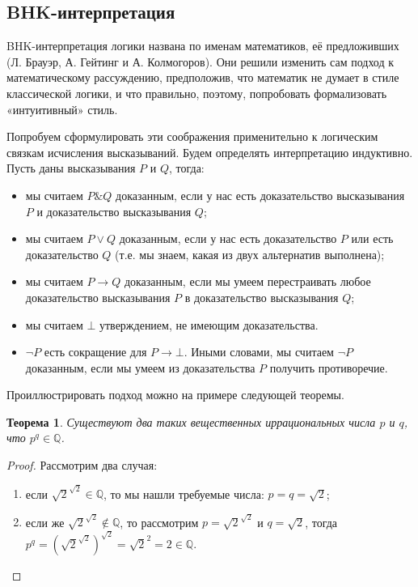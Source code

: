 \documentclass[a4paper,11pt]{article}
\newtheorem{thm}{Теорема}[section]
\theoremstyle{definition}
\begin{document}
\subsection*{BHK-интерпретация}
BHK-интерпретация логики названа по именам математиков, её предложивших (Л.
Брауэр, А. Гейтинг и А. Колмогоров). Они решили изменить сам подход к
математическому рассуждению, предположив, что математик не думает в стиле
классической логики, и что правильно, поэтому, попробовать формализовать
«интуитивный» стиль.

Попробуем сформулировать эти соображения применительно к логическим связкам
исчисления высказываний. Будем определять интерпретацию индуктивно. Пусть даны
высказывания $P$ и $Q$, тогда:
\begin{itemize}
\item мы считаем $P\mathbin{\&}Q$ доказанным, если у нас есть доказательство
  высказывания $P$ и доказательство высказывания $Q$;
\item мы считаем $P\vee Q$ доказанным, если у нас есть доказательство $P$ или
  есть доказательство $Q$ (т.е. мы знаем, какая из двух альтернатив выполнена);
\item мы считаем $P \to Q$ доказанным, если мы умеем перестраивать любое
  доказательство высказывания $P$ в доказательство высказывания $Q$;
\item мы считаем $\bot$ утверждением, не имеющим доказательства.
\item $\neg P$ есть сокращение для $P \to \bot$. Иными словами, мы считаем
  $\neg P$ доказанным, если мы умеем из доказательства $P$ получить
  противоречие.
\end{itemize}

Проиллюстрировать подход можно на примере следующей теоремы.

\begin{thm}
Существуют два таких вещественных иррациональных числа $p$ и $q$, что $p^q \in
\mathbb{Q}$.
\end{thm}
\begin{proof}
Рассмотрим два случая:
\begin{enumerate}
\item если $\sqrt{2}^{\sqrt{2}} \in \mathbb{Q}$, то мы нашли требуемые числа:
  $p = q = \sqrt{2}$;
\item если же $\sqrt{2}^{\sqrt{2}} \notin \mathbb{Q}$, то рассмотрим
  $p = \sqrt{2}^{\sqrt{2}}$ и $q = \sqrt{2}$, тогда
  $p^q = \left(\sqrt{2}^{\sqrt{2}}\right)^{\sqrt{2}} = \sqrt{2}^2 = 2 \in
  \mathbb{Q}$.
\end{enumerate}
\end{proof}
\end{document}
